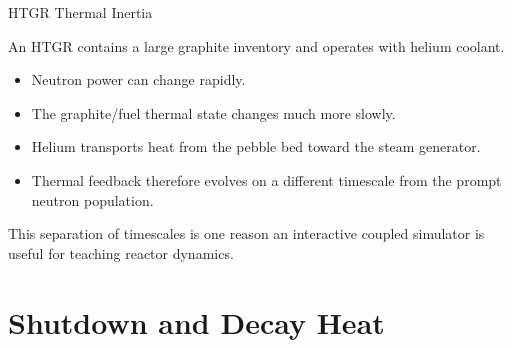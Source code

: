 \documentclass[aspectratio=169]{beamer}
\begin{document}

\begin{frame}{HTGR Thermal Inertia}

    An HTGR contains a large graphite inventory and operates with helium
    coolant.

    \vspace{1em}

    \begin{itemize}

        \item Neutron power can change rapidly.

        \item The graphite/fuel thermal state changes much more slowly.

        \item Helium transports heat from the pebble bed toward the
              steam generator.

        \item Thermal feedback therefore evolves on a different timescale from
              the prompt neutron population.

    \end{itemize}

    \vspace{1em}

    This separation of timescales is one reason an interactive coupled
    simulator is useful for teaching reactor dynamics.

\end{frame}



\section{Shutdown and Decay Heat}


\end{document}
